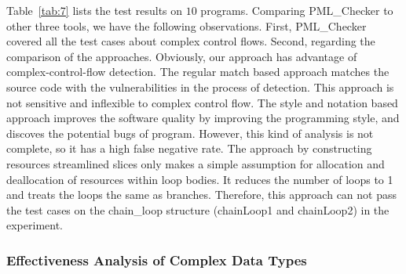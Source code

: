 Table~\ref{tab:7} lists the test results on $10$ programs. Comparing PML\_Checker to other three tools, we have the following observations. First, PML\_Checker covered all the test cases about complex control flows. %
Second, regarding the comparison of the approaches. Obviously, our approach has advantage of complex-control-flow detection. The regular match based approach matches the source code with the vulnerabilities in the process of detection. This approach is not sensitive and inflexible to complex control flow. The style and notation based approach improves the software quality by improving the programming style, and discoves the potential bugs of program. However, this kind of analysis is not complete, so it has a high false negative rate. The approach by constructing resources streamlined slices only makes a simple assumption for allocation and deallocation of resources within loop bodies. It reduces the number of loops to 1 and treats the loops the same as branches. Therefore, this approach can not pass the test cases on the chain\_loop structure (chainLoop1 and chainLoop2) in the experiment. \\


\subsubsection{Effectiveness Analysis of Complex Data Types}

\

